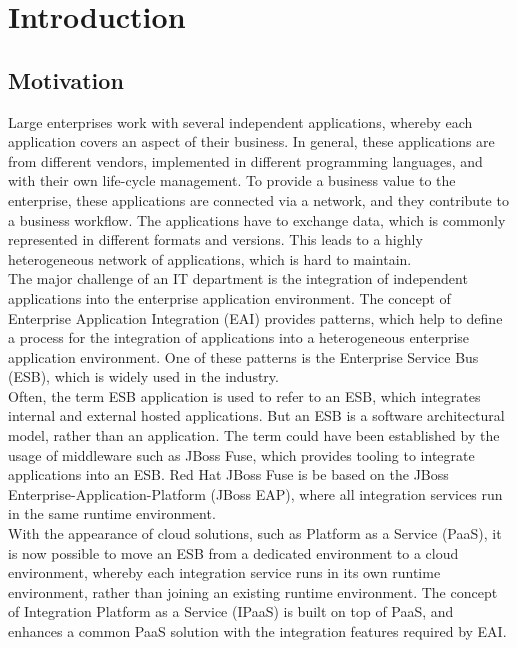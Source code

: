 \chapter{Introduction}
\label{cha:intro}

\section{Motivation}
\label{sec:intro-motivation}
Large enterprises work with several independent applications, whereby each application covers an aspect of their business. In general, these applications are from different vendors, implemented in different programming languages, and with their own life-cycle management. To provide a business value to the enterprise, these applications are connected via a network, and they contribute to a business workflow. The applications have to exchange data, which is commonly represented in different formats and versions. This leads to a highly heterogeneous network of applications, which is hard to maintain. \\

The major challenge of an IT department is the integration of independent applications into the enterprise application environment. The concept of Enterprise Application Integration (EAI) provides patterns, which help to define a process for the integration of applications into a heterogeneous enterprise application environment. One of these patterns is the Enterprise Service Bus (ESB), which is widely used in the industry\cite{EIP}. \\

Often, the term ESB application is used to refer to an ESB, which integrates internal and external hosted applications. But an ESB is a software architectural model, rather than an application. The term could have been established by the usage of middleware such as JBoss Fuse, which provides tooling to integrate applications into an ESB. Red Hat JBoss Fuse is be based on the JBoss Enterprise-Application-Platform (JBoss EAP), where all integration services run in the same runtime environment\cite{Fuse2018}. \\

With the appearance of cloud solutions, such as Platform as a Service (PaaS), it is now possible to move an ESB from a dedicated environment to a cloud environment, whereby each integration service runs in its own runtime environment, rather than joining an existing runtime environment. The concept of Integration Platform as a Service (IPaaS) is built on top of PaaS, and enhances a common PaaS solution with the integration features required by EAI\cite{PaaS2015, iPaaSP12015}. \\

